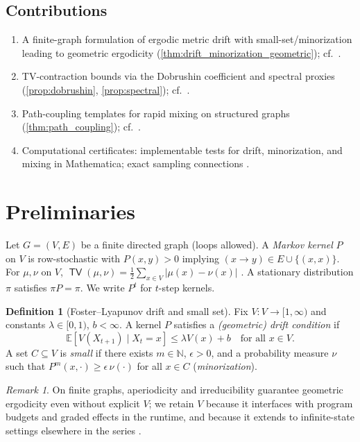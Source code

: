 \documentclass[11pt]{article}
\theoremstyle{plain}
\theoremstyle{definition}
\newtheorem{definition}[theorem]{Definition}
\theoremstyle{remark}
\newtheorem{remark}[theorem]{Remark}
\DeclareMathOperator{\TV}{\mathsf{TV}}
\newcommand{\EE}{\mathbb{E}}
\newcommand{\NN}{\mathbb{N}}
\newcommand{\1}{\mathds{1}}
\begin{document}
\subsection{Contributions}
\begin{enumerate}[label=(C\arabic*)]
\item A finite-graph formulation of ergodic metric drift with small-set/minorization leading to geometric ergodicity (\cref{thm:drift_minorization_geometric}); cf.\ \cite{MeynTweedie2009,RobertsRosenthal2004,Nummelin1984}.
\item TV-contraction bounds via the Dobrushin coefficient and spectral proxies (\cref{prop:dobrushin}, \cref{prop:spectral}); cf.\ \cite{Seneta2006,LevinPeresWilmer2009}.
\item Path-coupling templates for rapid mixing on structured graphs (\cref{thm:path_coupling}); cf.\ \cite{BubleyDyer1997}.
\item Computational certificates: implementable tests for drift, minorization, and mixing in Mathematica; exact sampling connections \cite{ProppWilson1996}.
\end{enumerate}

\section{Preliminaries}
Let $G=(V,E)$ be a finite directed graph (loops allowed). A \emph{Markov kernel} $P$ on $V$ is row-stochastic with $P(x,y)>0$ implying $(x\to y)\in E\cup \{(x,x)\}$. For $\mu,\nu$ on $V$, $\TV(\mu,\nu)=\tfrac12\sum_{x\in V}|\mu(x)-\nu(x)|$ \cite{LevinPeresWilmer2009}. A stationary distribution $\pi$ satisfies $\pi P=\pi$. We write $P^t$ for $t$-step kernels.

\begin{definition}[Foster--Lyapunov drift and small set]
Fix $V:V\to[1,\infty)$ and constants $\lambda\in[0,1)$, $b<\infty$. A kernel $P$ satisfies a \emph{(geometric) drift condition} if
\[
\EE[V(X_{t+1})\mid X_t=x]\le \lambda V(x)+b\quad\text{for all }x\in V.
\]
A set $C\subseteq V$ is \emph{small} if there exists $m\in\NN$, $\epsilon>0$, and a probability measure $\nu$ such that $P^m(x,\cdot)\ge \epsilon\,\nu(\cdot)$ for all $x\in C$ (\emph{minorization}).
\end{definition}

\begin{remark}
On finite graphs, aperiodicity and irreducibility guarantee geometric ergodicity even without explicit $V$; we retain $V$ because it interfaces with program budgets and graded effects in the runtime, and because it extends to infinite-state settings elsewhere in the series \cite{MeynTweedie2009}.
\end{remark}
\end{document}
